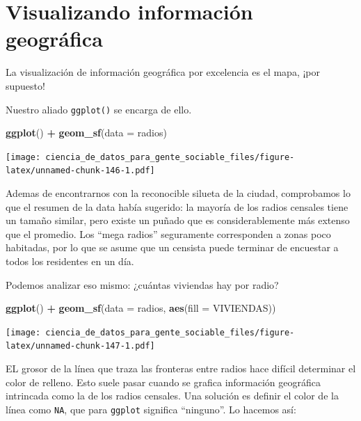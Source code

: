 \documentclass[]{book}
\newenvironment{Shaded}{\begin{snugshade}}{\end{snugshade}}
\newcommand{\KeywordTok}[1]{\textcolor[rgb]{0.13,0.29,0.53}{\textbf{#1}}}
\newcommand{\DataTypeTok}[1]{\textcolor[rgb]{0.13,0.29,0.53}{#1}}
\newcommand{\StringTok}[1]{\textcolor[rgb]{0.31,0.60,0.02}{#1}}
\newcommand{\OperatorTok}[1]{\textcolor[rgb]{0.81,0.36,0.00}{\textbf{#1}}}
\newcommand{\NormalTok}[1]{#1}
\begin{document}
\section{Visualizando información
geográfica}\label{visualizando-informacion-geografica}

La visualización de información geográfica por excelencia es el mapa,
¡por supuesto!

Nuestro aliado \texttt{ggplot()} se encarga de ello.

\begin{Shaded}
\begin{Highlighting}[]
\KeywordTok{ggplot}\NormalTok{() }\OperatorTok{+}\StringTok{ }\KeywordTok{geom_sf}\NormalTok{(}\DataTypeTok{data =}\NormalTok{ radios)}
\end{Highlighting}
\end{Shaded}

\texttt{[image: ciencia\_de\_datos\_para\_gente\_sociable\_files/figure-latex/unnamed-chunk-146-1.pdf]}

Ademas de encontrarnos con la reconocible silueta de la ciudad,
comprobamos lo que el resumen de la data había sugerido: la mayoría de
los radios censales tiene un tamaño similar, pero existe un puñado que
es considerablemente más extenso que el promedio. Los ``mega radios''
seguramente corresponden a zonas poco habitadas, por lo que se asume que
un censista puede terminar de encuestar a todos los residentes en un
día.

Podemos analizar eso mismo: ¿cuántas viviendas hay por radio?

\begin{Shaded}
\begin{Highlighting}[]
\KeywordTok{ggplot}\NormalTok{() }\OperatorTok{+}\StringTok{ }\KeywordTok{geom_sf}\NormalTok{(}\DataTypeTok{data =}\NormalTok{ radios, }\KeywordTok{aes}\NormalTok{(}\DataTypeTok{fill =}\NormalTok{ VIVIENDAS)) }
\end{Highlighting}
\end{Shaded}

\texttt{[image: ciencia\_de\_datos\_para\_gente\_sociable\_files/figure-latex/unnamed-chunk-147-1.pdf]}

EL grosor de la línea que traza las fronteras entre radios hace difícil
determinar el color de relleno. Esto suele pasar cuando se grafica
información geográfica intrincada como la de los radios censales. Una
solución es definir el color de la línea como \texttt{NA}, que para
\texttt{ggplot} significa ``ninguno''. Lo hacemos así:
\end{document}
